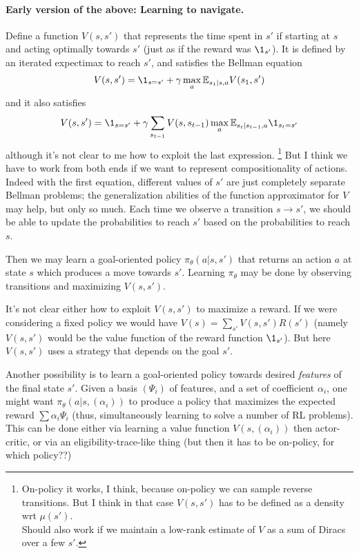 \documentclass[11pt,a4paper]{article}
\begin{document}
\paragraph{Early version of the above: Learning to navigate.} Define a function $V(s,s')$ that
represents the time spent in $s'$ if starting at $s$ and acting optimally
towards $s'$ (just as if the reward was $\1_{s'}$). It is defined by an iterated expectimax to reach $s'$, and
satisfies the Bellman equation
\begin{equation}
V(s,s')=\1_{s=s'}+\gamma \max_a \E_{s_1|s,a} V(s_1,s')
\end{equation}
and it also satisfies
\begin{equation}
V(s,s')=\1_{s=s'}+\gamma \sum_{s_{t-1}} V(s,s_{t-1})\max_a
\E_{s_t|s_{t-1},a}\1_{s_t=s'}
\end{equation}
although it's not clear to me how to exploit the last expression. 
\footnote{On-policy it works, I think, because on-policy we can sample
reverse transitions. But I think in that case $V(s,s')$ has to be defined
as a density wrt $\mu(s')$.\\Should also work if we maintain a low-rank
estimate of $V$ as a sum of Diracs over a few $s'$.}
But I
think we have to work from both ends if we want to represent
compositionality of actions. Indeed with the first equation, different values
of $s'$ are just completely separate Bellman problems; the generalization
abilities of the function approximator for $V$ may help, but only so
much. Each time we observe a transition $s\to s'$, we should be able to
update the probabilities to reach $s'$ based on the probabilities to
reach $s$.

Then we may learn a goal-oriented policy $\pi_\theta(a|s,s')$ that returns an
action $a$ at state $s$ which produces a move towards $s'$. Learning
$\pi_\theta$ may be done by observing transitions and maximizing
$V(s,s')$.

It's not clear either how to exploit $V(s,s')$ to maximize a reward. If
we were considering a fixed policy we would have
$V(s)=\sum_{s'}V(s,s')R(s')$ (namely $V(s,s')$ would be the value
function of the reward function $\1_{s'}$). But here $V(s,s')$ uses a
strategy that depends on the goal $s'$.

Another possibility is to learn a goal-oriented policy towards desired
\emph{features} of the final state $s'$. Given a basis $(\Psi_i)$ of
features, and a set of coefficient $\alpha_i$, one might want
$\pi_\theta(a|s,(\alpha_i))$ to produce a policy that maximizes the
expected reward $\sum \alpha_i \Psi_i$ (thus, simultaneously learning to
solve a number of RL problems). 
This can be done either via learning a value function $V(s,(\alpha_i))$
then actor-critic, or via an eligibility-trace-like thing (but then it
has to be on-policy, for which policy??)
\end{document}
